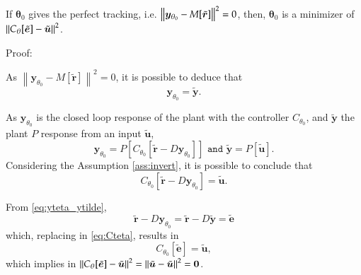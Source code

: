 
\begin{thm} 
   \label{thr:theoremVRFT}
   If $\bm{\theta}_0$ gives the perfect tracking, i.e. $\left\lVert\bm{y}_{\theta_0} - M[\tilde{\bm{r}}] \right\rVert^2 = 0$, then, $\bm{\theta}_0$ is a minimizer of $\left\lVert C_\theta[\tilde{\bm{e}}] - \tilde{\bm{u}}\right\rVert^2$.
\end{thm}

Proof:

As $\left\|\bm{y}_{\theta_0}-M[\tilde{\bm{r}}]\right\|^{2}=0$, it is possible to deduce that
\begin{equation}
\bm{y}_{\theta_0}=\tilde{\bm{y}}.
\label{eq:yteta_ytilde}
\end{equation}

As $\bm{y}_{\theta_0}$ is the closed loop response of the plant with the controller $C_{\theta_0}$, and $\tilde{\bm{y}}$ the plant $P$ response from an input $\tilde{\bm{u}}$,
\begin{equation*}
\bm{y}_{\theta_0}=P\left[C_{\theta_{0}}\left[\tilde{\bm{r}}-D \bm{y}_{\theta_0}\right]\right] \texttt{ and } \tilde{\bm{y}}=P[\tilde{\bm{u}}].
\label{eq:}
\end{equation*}
Considering the Assumption \ref {ass:invert}, it is possible to conclude that
\begin{equation}
   C_{\theta_{0}}\left[\tilde{\bm{r}}-D \bm{y}_{\theta_0}\right]=\tilde{\bm{u}}.
\label{eq:Cteta}
\end{equation}

From \eqref{eq:yteta_ytilde},
\begin{equation*}
   \tilde{\bm{r}}-D \bm{y}_{\theta_0}=\tilde{\bm{r}}-D \tilde{\bm{y}}=\tilde{\bm{e}}
\label{eq:}
\end{equation*}
which, replacing in \eqref{eq:Cteta}, results in
\begin{equation*}
C_{\theta_{0}}[\tilde{\bm{e}}]=\tilde{\bm{u}},
\label{eq:} 
\end{equation*}
which implies in $\left\lVert C_\theta[\tilde{\bm{e}}] - \tilde{\bm{u}}\right\rVert^2 = \left\lVert\tilde{\bm{u}} - \tilde{\bm{u}}\right\rVert^2 = \bm{0}$.


